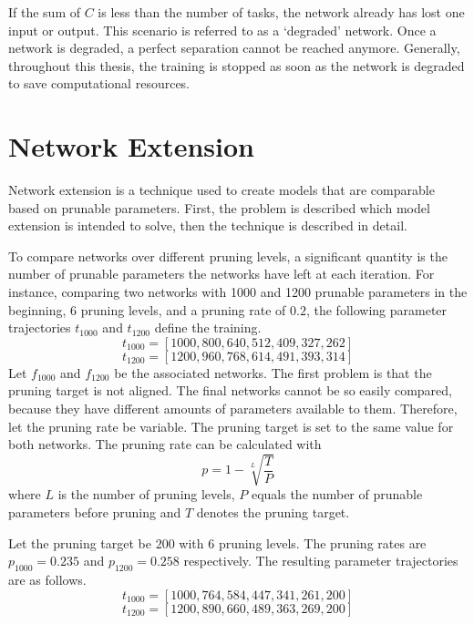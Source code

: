 If the sum of $C$ is less than the number of tasks, the network already has lost one input or output.
This scenario is referred to as a `degraded' network.
Once a network is degraded, a perfect separation cannot be reached anymore.
Generally, throughout this thesis, the training is stopped as soon as the network is degraded to save computational resources.

\section{Network Extension}\label{sec:extension}
Network extension is a technique used to create models that are comparable based on prunable parameters. 
First, the problem is described which model extension is intended to solve, then the technique is described in detail.

To compare networks over different pruning levels, a significant quantity is the number of prunable parameters the networks have left at each iteration.
For instance, comparing two networks with 1000 and 1200 prunable parameters in the beginning, 6 pruning levels, and a pruning rate of $0.2$, the following parameter trajectories $t_{1000}$ and $t_{1200}$ define the training.
\[
t_{1000} = [1000, 800, 640, 512, 409, 327, 262]
\]
\[
t_{1200} = [1200, 960, 768, 614, 491, 393, 314]
\]
Let $f_{1000}$ and $f_{1200}$ be the associated networks.
The first problem is that the pruning target is not aligned.
The final networks cannot be so easily compared, because they have different amounts of parameters available to them.
Therefore, let the pruning rate be variable. The pruning target is set to the same value for both networks.
The pruning rate can be calculated with 
\[
p = 1 - \sqrt[L]{\frac{T}{P}}
\]
where $L$ is the number of pruning levels, $P$ equals the number of prunable parameters before pruning and $T$ denotes the pruning target.

Let the pruning target be $200$ with 6 pruning levels.
The pruning rates are $p_{1000} = 0.235$ and $p_{1200} = 0.258$ respectively.
The resulting parameter trajectories are as follows.
\[
t_{1000} = [1000, 764, 584, 447, 341, 261, 200]
\]
\[
t_{1200} = [1200, 890, 660, 489, 363, 269, 200]
\]

